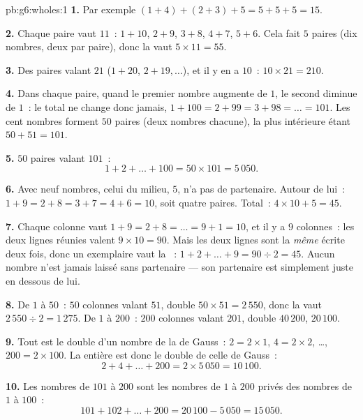 \begin{solution}{pb:g6:wholes:1}
\textbf{1.} Par exemple $(1 + 4) + (2 + 3) + 5 = 5 + 5 + 5 = 15$.

\textbf{2.} Chaque paire vaut $11$~: $1 + 10$, $2 + 9$, $3 + 8$,
$4 + 7$, $5 + 6$. Cela fait $5$ paires (dix nombres, deux par paire),
donc la  vaut $5 \times 11 = 55$.

\textbf{3.} Des paires valant $21$ ($1 + 20$, $2 + 19, \dots$), et il
y en a $10$~: $10 \times 21 = 210$.

\textbf{4.} Dans chaque paire, quand le premier nombre augmente de
$1$, le second diminue de $1$~: le total ne change donc jamais,
$1 + 100 = 2 + 99 = 3 + 98 = \dots = 101$. Les cent nombres forment
$50$ paires (deux nombres chacune), la plus intérieure étant
$50 + 51 = 101$.

\textbf{5.} $50$ paires valant $101$~:
\[
1 + 2 + \dots + 100 = 50 \times 101 = 5\,050 .
\]

\textbf{6.} Avec neuf nombres, celui du milieu, $5$, n'a pas de
partenaire. Autour de lui~: $1 + 9 = 2 + 8 = 3 + 7 = 4 + 6 = 10$,
soit quatre paires. Total~: $4 \times 10 + 5 = 45$.

\textbf{7.} Chaque colonne vaut $1 + 9 = 2 + 8 = \dots = 9 + 1 = 10$,
et il y a $9$ colonnes~: les deux lignes réunies valent
$9 \times 10 = 90$. Mais les deux lignes sont la \emph{même} 
écrite deux fois, donc un exemplaire vaut la ~:
$1 + 2 + \dots + 9 = 90 \div 2 = 45$. Aucun nombre n'est jamais
laissé sans partenaire --- son partenaire est simplement juste en
dessous de lui.

\textbf{8.} De $1$ à $50$~: $50$ colonnes valant $51$,  double
$50 \times 51 = 2\,550$, donc la  vaut $2\,550 \div 2 = 1\,275$.
De $1$ à $200$~: $200$ colonnes valant $201$,  double
$40\,200$,  $20\,100$.

\textbf{9.} Tout  est le double d'un nombre de la  de
Gauss~: $2 = 2 \times 1$, $4 = 2 \times 2$, \dots,
$200 = 2 \times 100$. La  entière est donc le double de celle de
Gauss~:
\[
2 + 4 + \dots + 200 = 2 \times 5\,050 = 10\,100 .
\]

\textbf{10.} Les nombres de $101$ à $200$ sont les nombres de $1$ à
$200$ privés des nombres de $1$ à $100$~:
\[
101 + 102 + \dots + 200 = 20\,100 - 5\,050 = 15\,050 .
\]


\end{solution}
